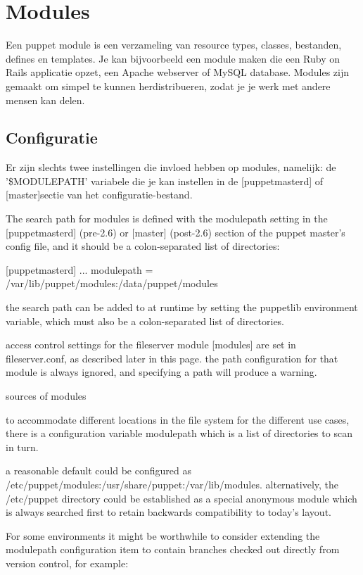\chapter{Modules}

Een puppet module is een verzameling van resource types, classes, bestanden, defines en templates. Je kan bijvoorbeeld een module maken die een Ruby on Rails applicatie opzet, een Apache webserver of MySQL database. Modules zijn gemaakt om simpel te kunnen herdistribueren, zodat je je werk met andere mensen kan delen.
%
\section{Configuratie}
Er zijn slechts twee instellingen die invloed hebben op modules, namelijk: de '\$MODULEPATH' variabele die je kan instellen in de [puppetmasterd] of [master]sectie van het configuratie-bestand.

    The search path for modules is defined with the modulepath setting in the [puppetmasterd] (pre-2.6) or [master] (post-2.6) section of the puppet master's config file, and it should be a colon-separated list of directories:

    [puppetmasterd]
    ...
    modulepath = /var/lib/puppet/modules:/data/puppet/modules

    the search path can be added to at runtime by setting the puppetlib environment variable, which must also be a colon-separated list of directories.

    access control settings for the fileserver module [modules] are set in fileserver.conf, as described later in this page. the path configuration for that module is always ignored, and specifying a path will produce a warning.

sources of modules

to accommodate different locations in the file system for the different use cases, there is a configuration variable modulepath which is a list of directories to scan in turn.

a reasonable default could be configured as /etc/puppet/modules:/usr/share/puppet:/var/lib/modules. alternatively, the /etc/puppet directory could be established as a special anonymous module which is always searched first to retain backwards compatibility to today's layout.

For some environments it might be worthwhile to consider extending the modulepath configuration item to contain branches checked out directly from version control, for example:

